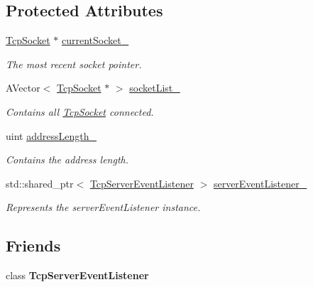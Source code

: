 \subsection*{Protected Attributes}
\begin{DoxyCompactItemize}
\item 
\mbox{\label{class_tcp_server_a9d7098c97cb60e1960295adb730ccf29}} 
\mbox{\hyperlink{class_tcp_socket}{Tcp\+Socket}} $\ast$ \mbox{\hyperlink{class_tcp_server_a9d7098c97cb60e1960295adb730ccf29}{current\+Socket\+\_\+}}
\begin{DoxyCompactList}\small\item\em The most recent socket pointer. \end{DoxyCompactList}\item 
\mbox{\label{class_tcp_server_a0ecef6a005f8665d422796304e4b2c49}} 
A\+Vector$<$ \mbox{\hyperlink{class_tcp_socket}{Tcp\+Socket}} $\ast$ $>$ \mbox{\hyperlink{class_tcp_server_a0ecef6a005f8665d422796304e4b2c49}{socket\+List\+\_\+}}
\begin{DoxyCompactList}\small\item\em Contains all \mbox{\hyperlink{class_tcp_socket}{Tcp\+Socket}} connected. \end{DoxyCompactList}\item 
\mbox{\label{class_tcp_server_a227067d2d336ada3759d6b6805a54db1}} 
uint \mbox{\hyperlink{class_tcp_server_a227067d2d336ada3759d6b6805a54db1}{address\+Length\+\_\+}}
\begin{DoxyCompactList}\small\item\em Contains the address length. \end{DoxyCompactList}\item 
\mbox{\label{class_tcp_server_a1ff8340e61e8e8020eb187e7d46d4f4c}} 
std\+::shared\+\_\+ptr$<$ \mbox{\hyperlink{class_tcp_server_event_listener}{Tcp\+Server\+Event\+Listener}} $>$ \mbox{\hyperlink{class_tcp_server_a1ff8340e61e8e8020eb187e7d46d4f4c}{server\+Event\+Listener\+\_\+}}
\begin{DoxyCompactList}\small\item\em Represents the server\+Event\+Listener instance. \end{DoxyCompactList}\end{DoxyCompactItemize}
\subsection*{Friends}
\begin{DoxyCompactItemize}
\item 
\mbox{\label{class_tcp_server_afff21cc973310e3b55b9f25cd8d76bd0}} 
class {\bfseries Tcp\+Server\+Event\+Listener}
\end{DoxyCompactItemize}
